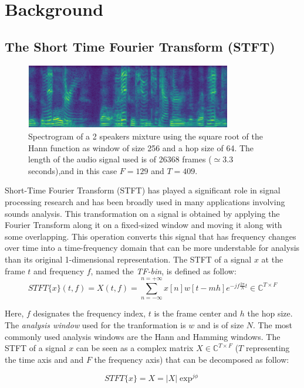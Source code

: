 \documentclass[master, tikz, final,11pt, dvipdfmx]{iscs-thesis}
\begin{document}
\chapter{Background}
\section{The Short Time Fourier Transform (STFT)}

\begin{figure}[h]
\centering
\includegraphics[width=0.8\textwidth]{xmix}
\caption[Spectrogram of a 2 speaker mixture]{Spectrogram of a 2 speakers mixture using the square root of the Hann function as window of size 256 and a hop size of 64. The length of the audio signal used is of 26368 frames ($\simeq 3.3$ seconds),and in this case $F = 129$ and $T = 409$.}
\label{fig:spectrogram} 
\end{figure}


Short-Time Fourier Transform (STFT) has played a significant role in signal processing research and has been broadly used in many applications involving sounds analysis.
This transformation on a signal is obtained by applying the Fourier Transform along it on a fixed-sized window and moving it along with some overlapping. This operation converts this signal that has frequency changes over time into a time-frequency domain that can be more understable for analysis than its original 1-dimensional representation.
The STFT of a signal $x$ at the frame $t$ and frequency $f$, named the \textit{TF-bin}, is defined as follow:
\[
	STFT\{x\}(t,f) = X(t,f) = \sum_{n=-\infty}^{n=+\infty}x[n]w[t-mh]e^{-jf\frac{2\pi}{N}t } \in \mathbb{C}^{T\times F}
\]

Here, $f$ designates the frequency index, $t$ is the frame center and $h$ the hop size. The \textit{analysis window} used for the tranformation is $w$ and is of size $N$. The most commonly used analysis windows are the Hann and Hamming windows.
The STFT of a signal $x$ can be seen as a complex matrix $X \in \mathbb{C}^{T\times F}$ ($T$ representing the time axis and and $F$ the frequency axis) that can be decomposed as follow:

\[
	STFT\{x\} = X = |X|\exp^{j\phi}
\]
\end{document}
